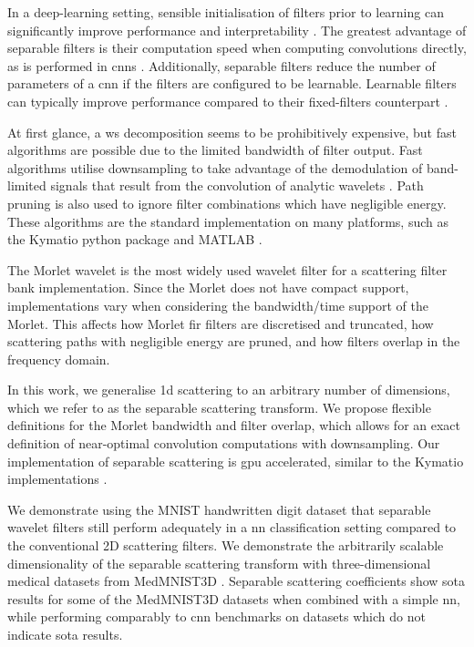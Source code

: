 \documentclass[journal]{IEEEtran}
\begin{document}
In a deep-learning setting, sensible initialisation of filters prior to learning can significantly improve performance and interpretability \cite{sincnet}. The greatest advantage of separable filters is their computation speed when computing convolutions directly, as is performed in \acp{cnn} \cite{separablecnn}. Additionally, separable filters reduce the number of parameters of a \ac{cnn} if the filters are configured to be learnable. Learnable filters can typically improve performance compared to their fixed-filters counterpart \cite{learnablewavelettransform}. 

At first glance, a \ac{ws} decomposition seems to be prohibitively expensive, but fast algorithms are possible due to the limited bandwidth of filter output. Fast algorithms utilise downsampling to take advantage of the demodulation of band-limited signals that result from the convolution of analytic wavelets \cite{2dscattering, 3dscattering, 1dscattering1}. Path pruning is also used to ignore filter combinations which have negligible energy. These algorithms are the standard implementation on many platforms, such as the Kymatio python package \cite{kymatio} and MATLAB \cite{MATLAB}.

The Morlet wavelet is the most widely used wavelet filter for a scattering filter bank implementation. Since the Morlet does not have compact support, implementations vary when considering the bandwidth/time support of the Morlet. This affects how Morlet \ac{fir} filters are discretised and truncated, how scattering paths with negligible energy are pruned, and how filters overlap in the frequency domain. 

In this work, we generalise \ac{1d} scattering to an arbitrary number of dimensions, which we refer to as the separable scattering transform. We propose flexible definitions for the Morlet bandwidth and filter overlap, which allows for an exact definition of near-optimal convolution computations with downsampling. Our implementation of separable scattering is \ac{gpu} accelerated, similar to the Kymatio implementations \cite{kymatio}. 

We demonstrate using the MNIST handwritten digit dataset \cite{mnist} that separable wavelet filters still perform adequately in a \ac{nn} classification setting compared to the conventional 2D scattering filters. We demonstrate the arbitrarily scalable dimensionality of the separable scattering transform with three-dimensional medical datasets from MedMNIST3D \cite{medmnist}. Separable scattering coefficients show \ac{sota} results for some of the MedMNIST3D datasets when combined with a simple \ac{nn}, while performing comparably to \ac{cnn} benchmarks on datasets which do not indicate \ac{sota} results.
\end{document}

